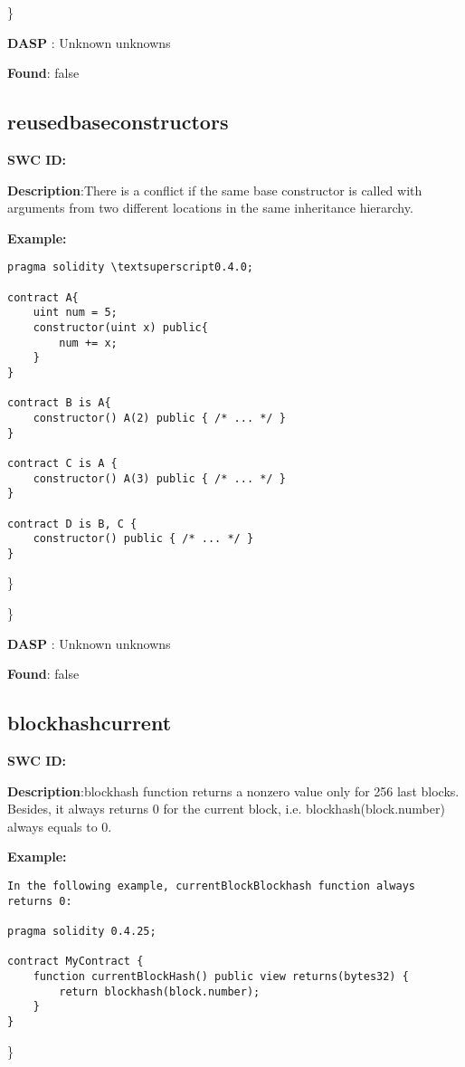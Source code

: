 \documentclass{article}
\begin{document}
\} 

\textbf{DASP} : Unknown unknowns

\textbf{Found}: false

\subsection{reused\textunderscore base\textunderscore constructors} 
\textbf{SWC \textunderscore ID:} 

\textbf{Description}:There is a conflict if the same base constructor is called with arguments from two different locations in the same inheritance hierarchy.


\textbf{Example:} 
\begin{verbatim}
pragma solidity \textsuperscript0.4.0;

contract A{
    uint num = 5;
    constructor(uint x) public{
        num += x;
    }
}

contract B is A{
    constructor() A(2) public { /* ... */ }
}

contract C is A {
    constructor() A(3) public { /* ... */ }
}

contract D is B, C {
    constructor() public { /* ... */ }
}

\end{verbatim}\} 

\} 

\textbf{DASP} : Unknown unknowns

\textbf{Found}: false

\subsection{blockhash\textunderscore current} 
\textbf{SWC \textunderscore ID:} 

\textbf{Description}:blockhash function returns a non\textendash zero value only for 256 last blocks. Besides, it always returns 0 for the current block, i.e. blockhash(block.number) always equals to 0.


\textbf{Example:} 
\begin{verbatim}
In the following example, currentBlockBlockhash function always returns 0:

pragma solidity 0.4.25;

contract MyContract {
    function currentBlockHash() public view returns(bytes32) {
        return blockhash(block.number);
    }
}

\end{verbatim}\} 
\end{document}
